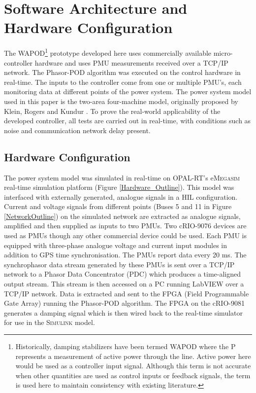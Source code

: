 \documentclass[journal]{IEEEtran}
\begin{document}
\section{Software Architecture and Hardware Configuration}\label{softhardware}

The WAPOD\footnote{Historically, damping stabilizers have been termed WAPOD where the P represents a measurement of active power through the line. Active power here would be used as a controller input signal. Although this term is not accurate when other quantities are used as control inputs or feedback signals, the term is used here to maintain consistency with existing literature.} prototype developed here uses commercially available micro-controller hardware and uses PMU measurements received over a TCP/IP network. The Phasor-POD algorithm \cite{PhasorPOD} was executed on the control hardware in real-time. The inputs to the controller come from one or multiple PMU's, each monitoring data at different points of the power system. The power system model used in this paper is the two-area four-machine model, originally proposed by Klein, Rogers and Kundur \cite{KundurTwoArea}. To prove the real-world applicability of the developed controller, all tests are carried out in real-time, with conditions such as noise and communication network delay present.

\subsection{Hardware Configuration}
The power system model was simulated in real-time on OPAL-RT's e\textsc{Megasim} \cite{eMEGASIM} real-time simulation platform (Figure \ref {Hardware_Outline}). This model was interfaced with externally generated, analogue signals in a HIL configuration. Current and voltage signals from different points (Buses 5 and 11 in Figure \ref{NetworkOutline}) on the simulated network are extracted as analogue signals, amplified and then supplied as inputs to two PMUs. Two cRIO-9076 \cite{cRIO9081} devices are used as PMUs though any other commercial device could be used. Each PMU is equipped with three-phase analogue voltage and current input modules in addition to GPS time synchronisation. The PMUs report data every 20 ms. The synchrophasor data stream  generated by these PMUs is sent over a TCP/IP network to a Phasor Data Concentrator (PDC) which produces a time-aligned output stream. This stream is then accessed on a PC running LabVIEW over a TCP/IP network. Data is extracted and sent to the FPGA (Field Programmable Gate Array) running the Phasor-POD algorithm. The FPGA on the cRIO-9081 \cite{cRIO9081} generates a damping signal which is then wired back to the real-time simulator for use in the \textsc{Simulink} model.
\end{document}
